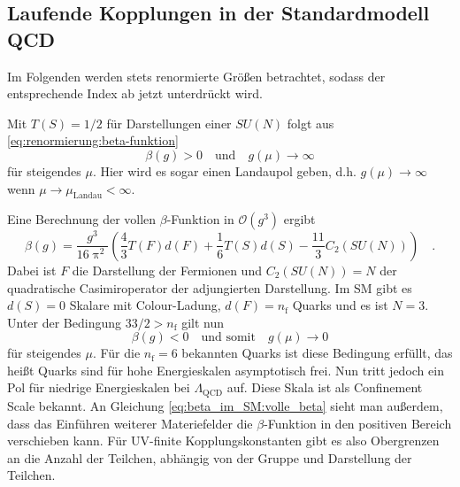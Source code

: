 \subsection{Laufende Kopplungen in der Standardmodell QCD}\label{beta_im_SM}
	Im Folgenden werden stets renormierte Größen betrachtet, sodass der 
	entsprechende Index ab jetzt unterdrückt wird.
	
	Mit $T(S)=1/2$ für Darstellungen einer $SU(N)$ folgt aus 
   \eqref{eq:renormierung:beta-funktion} 
   \begin{equation}
	\beta(g)>0 \quad \text{und} \quad    
   g(\mu) \longrightarrow \infty
   \label{eq:beta_im_SM:landau_pol}
   \end{equation}
   für steigendes $\mu$. Hier wird es sogar einen Landaupol geben, d.h. 
   $g(\mu)\to \infty$ wenn $\mu\to \mu_\text{Landau}<\infty$.  
   
   Eine Berechnung der vollen $\beta$-Funktion in 
   $\mathcal{O}(g^3)$ ergibt 
   \cite{Luo_Wang_Xiao} 
   \begin{equation}
   \beta(g)=\frac{g^3}{16\uppi^2} \left( \frac{4}{3} T(F)d(F) +
   \frac{1}{6} T(S) d(S) - \frac{11}{3} C_2(SU(N)) \right)\quad .
   \label{eq:beta_im_SM:volle_beta}
   \end{equation}
   Dabei ist $F$ die Darstellung der Fermionen und $C_2(SU(N))=N$ der 
   quadratische Casimiroperator der adjungierten Darstellung. Im SM 
   gibt es $d(S)=0$ Skalare mit Colour-Ladung, $d(F)=n_\text{f}$ Quarks und 
   es ist $N=3$. Unter der Bedingung $33/2  >  n_\text{f}$ gilt nun 
	\begin{equation}
	\beta(g)<0 \quad \text{und somit} \quad g(\mu) \longrightarrow 0
	\end{equation}	   
	für steigendes $\mu$. Für die $n_\text{f}=6$ bekannten Quarks ist diese 
	Bedingung erfüllt, das heißt Quarks sind für hohe Energieskalen 
	asymptotisch frei. 
	Nun tritt jedoch ein Pol für niedrige Energieskalen bei $\Lambda_\text{QCD}$ 
	auf. Diese Skala ist als Confinement Scale bekannt.	
	An Gleichung \eqref{eq:beta_im_SM:volle_beta} 
	sieht man außerdem, dass das Einführen weiterer Materiefelder 
	die $\beta$-Funktion in den positiven Bereich verschieben kann. Für 
	UV-finite Kopplungskonstanten gibt es also Obergrenzen an die Anzahl der 
	Teilchen, abhängig von der Gruppe und Darstellung der Teilchen.
	
   
   